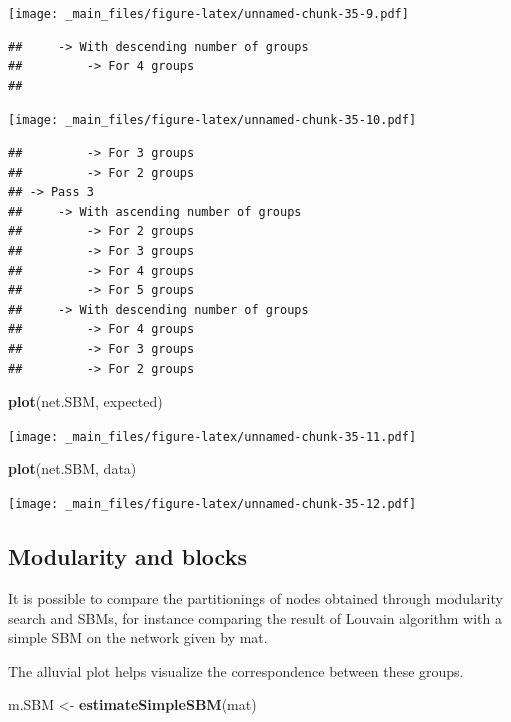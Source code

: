\documentclass[
]{book}
\newenvironment{Shaded}{\begin{snugshade}}{\end{snugshade}}
\newcommand{\FunctionTok}[1]{\textcolor[rgb]{0.13,0.29,0.53}{\textbf{#1}}}
\newcommand{\NormalTok}[1]{#1}
\newcommand{\OtherTok}[1]{\textcolor[rgb]{0.56,0.35,0.01}{#1}}
\newcommand{\StringTok}[1]{\textcolor[rgb]{0.31,0.60,0.02}{#1}}
\theoremstyle{definition}
\theoremstyle{definition}
\theoremstyle{definition}
\theoremstyle{definition}
\theoremstyle{remark}
\begin{document}
\texttt{[image: \_main\_files/figure-latex/unnamed-chunk-35-9.pdf]}

\begin{verbatim}
##     -> With descending number of groups
##         -> For 4 groups
## 
\end{verbatim}

\texttt{[image: \_main\_files/figure-latex/unnamed-chunk-35-10.pdf]}

\begin{verbatim}
##         -> For 3 groups
##         -> For 2 groups
## -> Pass 3
##     -> With ascending number of groups
##         -> For 2 groups
##         -> For 3 groups
##         -> For 4 groups
##         -> For 5 groups
##     -> With descending number of groups
##         -> For 4 groups
##         -> For 3 groups
##         -> For 2 groups
\end{verbatim}

\begin{Shaded}
\begin{Highlighting}[]
\FunctionTok{plot}\NormalTok{(net.SBM, }\StringTok{\textquotesingle{}expected\textquotesingle{}}\NormalTok{)}
\end{Highlighting}
\end{Shaded}

\texttt{[image: \_main\_files/figure-latex/unnamed-chunk-35-11.pdf]}

\begin{Shaded}
\begin{Highlighting}[]
\FunctionTok{plot}\NormalTok{(net.SBM, }\StringTok{\textquotesingle{}data\textquotesingle{}}\NormalTok{)}
\end{Highlighting}
\end{Shaded}

\texttt{[image: \_main\_files/figure-latex/unnamed-chunk-35-12.pdf]}

\subsection{Modularity and blocks}\label{modularity-and-blocks}

It is possible to compare the partitionings of nodes obtained through modularity search and SBMs, for instance comparing the result of Louvain algorithm with a simple SBM on the network given by mat.

The alluvial plot helps visualize the correspondence between these groups.

\begin{Shaded}
\begin{Highlighting}[]
\NormalTok{m.SBM }\OtherTok{\textless{}{-}} \FunctionTok{estimateSimpleSBM}\NormalTok{(mat)}
\end{Highlighting}
\end{Shaded}
\end{document}
